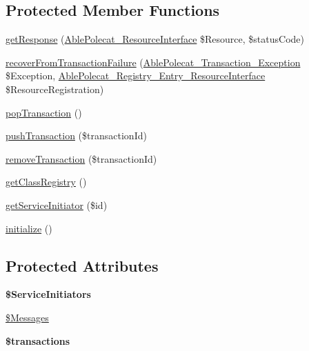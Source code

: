 \subsection*{Protected Member Functions}
\begin{DoxyCompactItemize}
\item 
\hyperlink{class_able_polecat___service___bus_a01219e75781fce23cab2d8ff3ad781be}{get\+Response} (\hyperlink{interface_able_polecat___resource_interface}{Able\+Polecat\+\_\+\+Resource\+Interface} \$Resource, \$status\+Code)
\item 
\hyperlink{class_able_polecat___service___bus_a951d75d2398059585e5add62a0d99a93}{recover\+From\+Transaction\+Failure} (\hyperlink{class_able_polecat___transaction___exception}{Able\+Polecat\+\_\+\+Transaction\+\_\+\+Exception} \$Exception, \hyperlink{interface_able_polecat___registry___entry___resource_interface}{Able\+Polecat\+\_\+\+Registry\+\_\+\+Entry\+\_\+\+Resource\+Interface} \$Resource\+Registration)
\item 
\hyperlink{class_able_polecat___service___bus_a26d0ab9c59866d7ddfaa3248c7840148}{pop\+Transaction} ()
\item 
\hyperlink{class_able_polecat___service___bus_a4d0e9b6345b13ebc1807fc7b15e3a16a}{push\+Transaction} (\$transaction\+Id)
\item 
\hyperlink{class_able_polecat___service___bus_a0ef61a3bcfc0ff8826283ebc9daa2d7d}{remove\+Transaction} (\$transaction\+Id)
\item 
\hyperlink{class_able_polecat___service___bus_a093abe716e268a9511faf781e09a953c}{get\+Class\+Registry} ()
\item 
\hyperlink{class_able_polecat___service___bus_ae0be5c8ae594b9f8ef10b57455a76214}{get\+Service\+Initiator} (\$id)
\item 
\hyperlink{class_able_polecat___service___bus_a91098fa7d1917ce4833f284bbef12627}{initialize} ()
\end{DoxyCompactItemize}
\subsection*{Protected Attributes}
\begin{DoxyCompactItemize}
\item 
\hypertarget{class_able_polecat___service___bus_a68774350cd26e1735aaae91bd9e72d36}{}{\bfseries \$\+Service\+Initiators}\label{class_able_polecat___service___bus_a68774350cd26e1735aaae91bd9e72d36}

\item 
\hyperlink{class_able_polecat___service___bus_aae046bbb8c846e4d0a266db8991fa7a7}{\$\+Messages}
\item 
\hypertarget{class_able_polecat___service___bus_acf491548539fb3e48517eae4df476304}{}{\bfseries \$transactions}\label{class_able_polecat___service___bus_acf491548539fb3e48517eae4df476304}

\end{DoxyCompactItemize}


